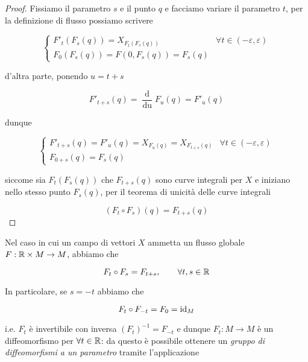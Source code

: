 \begin{proof}
	Fissiamo il parametro $ s $ e il punto $ q $ e facciamo variare il parametro $ t $, per la definizione di flusso possiamo scrivere
	
	\begin{equation}
		\begin{cases}
			F'_{t}(F_{s}(q)) = X_{F_{t}(F_{s}(q))} & \forall t \in (-\varepsilon,\varepsilon)\\
			F_{0}(F_{s}(q)) = F(0,F_{s}(q)) = F_{s}(q)
		\end{cases}
	\end{equation}

	d'altra parte, ponendo $ u = t+s $
	
	\begin{equation}
		F'_{t+s}(q) = \dfrac{\operatorname{d}}{\operatorname{du}} F_{u}(q) = F'_{u}(q)
	\end{equation}

	dunque
	
	\begin{equation}
		\begin{cases}
			F'_{t+s}(q) = F'_{u}(q) = X_{F_{u}(q)} = X_{F_{t+s}(q)} & \forall t \in (-\varepsilon,\varepsilon)\\
			F_{0+s}(q) = F_{s}(q)
		\end{cases}
	\end{equation}

	siccome sia $ F_{t}(F_{s}(q)) $ che $ F_{t+s}(q) $ sono curve integrali per $ X $ e iniziano nello stesso punto $ F_{s}(q) $, per il teorema di unicità delle curve integrali
	
	\begin{equation}
		(F_{t} \circ F_{s})(q) = F_{t+s}(q)
	\end{equation}
\end{proof}

Nel caso in cui un campo di vettori $ X $ ammetta un flusso globale $ F : \mathbb{R} \times M \to M $, abbiamo che

\begin{equation}
	F_{t} \circ F_{s} = F_{t+s}, \qquad \forall t,s \in \mathbb{R}
\end{equation}

In particolare, se $ s = -t $ abbiamo che

\begin{equation}
	F_{t} \circ F_{-t} = F_{0} = \operatorname{id}_{M}
\end{equation}

i.e. $ F_{t} $ è invertibile con inversa $ (F_{t})^{-1} = F_{-t} $ e dunque $ F_{t} : M \to M $ è un diffeomorfismo per $ \forall t \in \mathbb{R} $: da questo è possibile ottenere un \textit{gruppo di diffeomorfismi a un parametro} tramite l'applicazione

